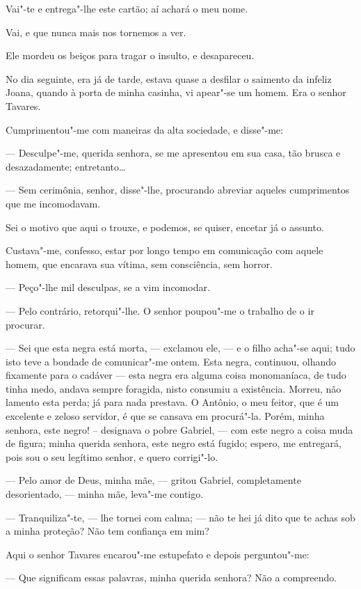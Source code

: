 Vai"-te e entrega"-lhe este cartão; aí achará o meu nome.

Vai, e que nunca mais nos tornemos a ver.

Ele mordeu os beiços para tragar o insulto, e desapareceu.

No dia seguinte, era já de tarde, estava quase a desfilar o saimento da
infeliz Joana, quando à porta de minha casinha, vi apear"-se um homem.
Era o senhor Tavares.

Cumprimentou"-me com maneiras da alta sociedade, e disse"-me:

--- Desculpe"-me, querida senhora, se me apresentou em sua casa, tão
brusca e desazadamente; entretanto\ldots{}

--- Sem cerimônia, senhor, disse"-lhe, procurando abreviar aqueles
cumprimentos que me incomodavam.

Sei o motivo que aqui o trouxe, e podemos, se quiser, encetar já o
assunto.

Custava"-me, confesso, estar por longo tempo em comunicação com aquele
homem, que encarava sua vítima, sem consciência, sem horror.

--- Peço"-lhe mil desculpas, se a vim incomodar.

--- Pelo contrário, retorqui"-lhe. O senhor poupou"-me o trabalho de o ir
procurar.

--- Sei que esta negra está morta, --- exclamou ele, --- e o filho acha"-se
aqui; tudo isto teve a bondade de comunicar"-me ontem. Esta negra,
continuou, olhando fixamente para o cadáver --- esta negra era alguma
coisa monomaníaca, de tudo tinha medo, andava sempre foragida, nisto
consumiu a existência. Morreu, não lamento esta perda; já para nada
prestava. O Antônio, o meu feitor, que é um excelente e zeloso servidor,
é que se cansava em procurá"-la. Porém, minha senhora, este negro! --
designava o pobre Gabriel, --- com este negro a coisa muda de figura;
minha querida senhora, este negro está fugido; espero, me entregará,
pois sou o seu legítimo senhor, e quero corrigi"-lo.

--- Pelo amor de Deus, minha mãe, --- gritou Gabriel, completamente
desorientado, --- minha mãe, leva"-me contigo.

--- Tranquiliza"-te, --- lhe tornei com calma; --- não te hei já dito que
te achas sob a minha proteção? Não tem confiança em mim?

Aqui o senhor Tavares encarou"-me estupefato e depois perguntou"-me:

--- Que significam essas palavras, minha querida senhora? Não a
compreendo.

